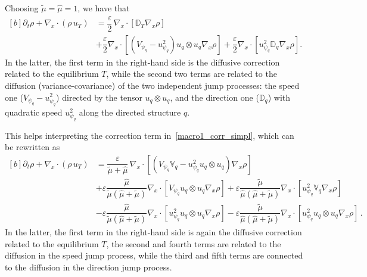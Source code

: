 \documentclass[a4paper]{article}
\theoremstyle{Theorem}\newtheorem{proposition}{Proposition}[section]
\theoremstyle{Remark}\newtheorem{remark}{Remark}[section]
\theoremstyle{Theorem}\newtheorem{theorem}{Theorem}[section]
\newcommand{\hmu}{\hat{\mu}}
\newcommand{\tmu}{\tilde{\mu}}
\begin{document}
Choosing $\tmu=\hmu=1$, we have that
\begin{equation*}
\begin{aligned}[b]
    \partial_t \rho + \nabla_x \cdot (\rho \, u_T)& =  \dfrac{\varepsilon}{2} \, \nabla_x \cdot\left[\mathbb{D}_T \nabla_x\rho\right]\\[0.3cm]
    &+\dfrac{\varepsilon}{2}\nabla_x\cdot\left[(V_{\psi_q} -u_{\psi_q}^2)u_q\otimes u_q\nabla_x\rho\right]+\dfrac{\varepsilon}{2}\nabla_x\cdot[u_{\psi_q}^2 \mathbb{D}_q\nabla_x\rho].
    \end{aligned}
\end{equation*} 
In the latter, the first term in the right-hand side is the diffusive correction related to the equilibrium $T$, while the second two terms are related to the diffusion (variance-covariance) of the two independent jump processes: the speed one ($V_{\psi_q} -u_{\psi_q}^2$) directed by the tensor $u_q\otimes u_q$, and the direction one ($\mathbb{D}_q$) with quadratic speed $u_{\psi_q}^2$ along the directed structure $q$. 

This helps interpreting the correction term in~\eqref{macro1_corr_simpl}, which can be rewritten as
\begin{equation*}
\begin{aligned}[b]
    \partial_t \rho + \nabla_x \cdot (\rho \, u_T)& =  \dfrac{\varepsilon}{\tmu+\hmu} \, \nabla_x \cdot\left[\left(V_{\psi_q}\mathbb{V}_q-u_{\psi_q}^2u_q\otimes u_q\right) \nabla_x\rho\right]\\[0.3cm]
    &+\varepsilon\dfrac{\hmu}{\tmu(\hmu+\tmu)}\nabla_x\cdot\left[V_{\psi_q} u_q\otimes u_q\nabla_x\rho\right]+\varepsilon\dfrac{\tmu}{\hmu(\hmu+\tmu)}\nabla_x\cdot[u_{\psi_q}^2 \mathbb{V}_q\nabla_x\rho]\\[0.3cm]
    &-\varepsilon\dfrac{\hmu}{\tmu(\hmu+\tmu)}\nabla_x\cdot\left[u_{\psi_q}^2u_q\otimes u_q\nabla_x\rho\right]-\varepsilon\dfrac{\tmu}{\hmu(\hmu+\tmu)}\nabla_x\cdot\left[u_{\psi_q}^2u_q\otimes u_q\nabla_x\rho\right]\,.
    \end{aligned}
\end{equation*} 
In the latter, the first term in the right-hand side is again the diffusive correction related to the equilibrium $T$, the second and fourth terms are related to the diffusion in the speed jump process, while the third and fifth terms are connected to the diffusion in the direction jump process. 
\end{document}
